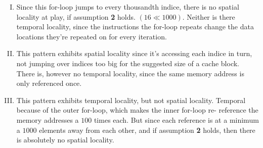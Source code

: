 \documentclass[fontsize=11pt, paper=a4, titlepage]{article}
\begin{document}
\begin{enumerate}[a)]
    \begin{enumerate}[I)]

        \item Since this for-loop jumps to every thousandth indice, there is no
spatial locality at play, if assumption \textbf{2} holds. $(16 \ll 1000)$.
Neither is there temporal locality, since the instructions the for-loop repeats
change the data locations they're repeated on for every iteration.

        \item This pattern exhibits spatial locality since it's accessing each
indice in turn, not jumping over indices too big for the suggested size of a
cache block. There is, however no temporal locality, since the same memory
address is only referenced once.

        \item This pattern exhibits temporal locality, but not spatial locality.
Temporal because of the outer for-loop, which makes the inner for-loop re-
reference the memory addresses a $100$ times each. But since each reference is
at a minimum a $1000$ elements away from each other, and if assumption
\textbf{2} holds, then there is absolutely no spatial locality.

    \end{enumerate}
\end{enumerate}
\end{document}

